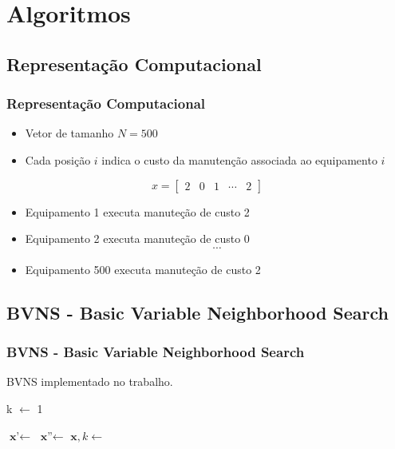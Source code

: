 \documentclass{beamer}
\begin{document}
\section{Algoritmos}

\subsection{Representação Computacional}
    \begin{frame}
        \frametitle{Representação Computacional}

        \begin{itemize}
            \item Vetor de tamanho $N = 500$
            \item Cada posição $i$ indica o custo da manutenção associada ao equipamento $i$
        \end{itemize}

        \[ x = \begin{bmatrix} 2 & 0 & 1 & \cdots & 2 \end{bmatrix} \]

        \begin{itemize}
            \item Equipamento 1 executa manuteção de custo 2
            \item Equipamento 2 executa manuteção de custo 0
            \[  \cdots  \]
            \item Equipamento 500 executa manuteção de custo 2
        \end{itemize}
    \end{frame}


\subsection{BVNS - Basic Variable Neighborhood Search}
    \begin{frame}
        \frametitle{BVNS - Basic Variable Neighborhood Search}
        \begin{algorithm}[H]
            \caption{BVNS implementado no trabalho.}\label{alg:bvns}
            \begin{algorithmic}[1]
                    \State k $\gets$ 1
        
                        \State $ \textbf{x'} \gets$  
                        \State $ \textbf{x''} \gets$  
                        \State $ \textbf{x}, k \gets$  
                    \EndWhile
                \EndWhile
            \EndProcedure 
            \end{algorithmic}
        \end{algorithm}
    \end{frame}
\end{document}
